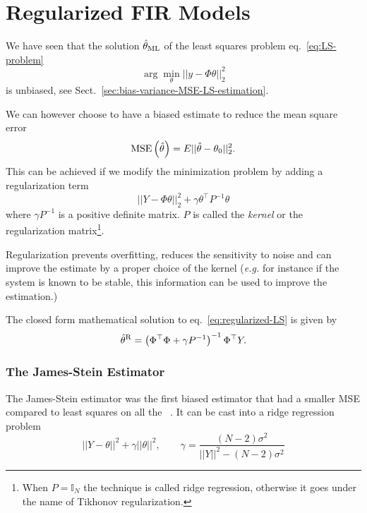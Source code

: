 \chapter{Regularized FIR Models}
\label{chap:regularised-FIR-models}

We have seen that the solution $\hat{\theta}_\textrm{ML}$ of the least squares problem eq.~\eqref{eq:LS-problem}
\begin{equation*}
  \arg\min_\theta ||y-\Phi \theta||_2^2
\end{equation*}
is unbiased, see Sect.~\ref{sec:bias-variance-MSE-LS-estimation}.

We can however choose to have a biased estimate to reduce the mean square error
\begin{equation*}
  \textrm{MSE}\left(\hat{\theta}\right) = E{||\hat{\theta}-\theta_0||_2^2}.
\end{equation*}
This can be achieved if we modify the minimization problem by adding a regularization term
\begin{equation}
  \label{eq:regularized-LS}
  ||Y-\Phi \theta||_2^2 + \gamma \theta^\top P^{-1}\theta
\end{equation}
where $\gamma P^{-1}$ is a positive definite matrix. $P$ is called the \emph{kernel} or the regularization matrix\footnote{When $P=\mathbb{I}_N$ the technique is called ridge regression, otherwise it goes under the name of Tikhonov regularization.}.

Regularization prevents overfitting, reduces the sensitivity to noise and can improve the estimate by a proper choice of the kernel (\textit{e.g.} for instance if the system is known to be stable, this information can be used to improve the estimation.)


The closed form mathematical solution to eq.~\eqref{eq:regularized-LS} is given by
\begin{equation}
  \label{eq:regularized-LS-solution}
  \hat{\theta}^\textrm{R} = \left(\Phi^\top\Phi + \gamma P^{-1}\right)^{-1}\Phi^\top Y.
\end{equation}

\subsection{The James-Stein Estimator}
\label{sec:james-stein-estimator}

The James-Stein estimator was the first biased estimator that had a smaller MSE compared to least squares on all the ~\cite[page~3]{pillonetto}. It can be cast into a ridge regression problem
\begin{equation*}
  ||Y-\theta||^2 + \gamma ||\theta||^2,\hspace{2em} \gamma = \frac{(N-2)\sigma^2}{||Y||^2 - (N-2)\sigma^2}
\end{equation*}

